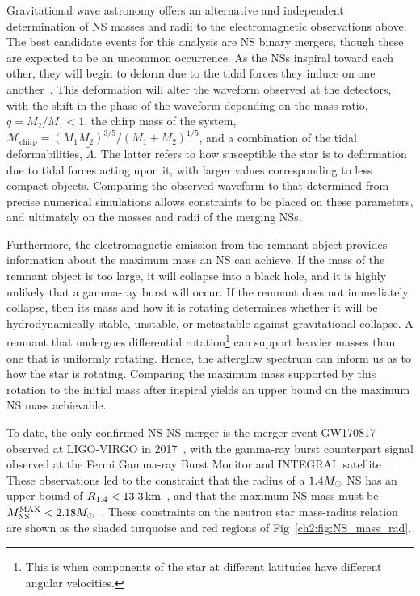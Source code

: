 Gravitational wave astronomy offers an alternative and independent determination of NS masses and radii to the electromagnetic observations above. The best candidate events for this analysis are NS binary mergers, though these are expected to be an uncommon occurrence. As the NSs inspiral toward each other, they will begin to deform due to the tidal forces they induce on one another~\cite{Lattimer:2019eez_jun_NeutronStarMass}. 
This deformation will alter the waveform observed at the detectors, with the shift in the phase of the waveform depending on the mass ratio, $q = M_2/M_1 <1$, the chirp mass of the system, $\mathcal{M}_\mathrm{chirp} = (M_1 M_2)^{3/5}/(M_1 + M_2)^{1/5}$, and a combination of the tidal deformabilities, $\tilde\Lambda$. The latter refers to how susceptible the star is to deformation due to tidal forces acting upon it, with larger values corresponding to less compact objects. Comparing the observed waveform to that determined from precise numerical simulations allows constraints to be placed on these parameters, and ultimately on the masses and radii of the merging NSs.

Furthermore, the electromagnetic emission from the remnant object provides information about the maximum mass an NS can achieve. 
If the mass of the remnant object is too large, it will collapse into a black hole, and it is highly unlikely that a gamma-ray burst will occur. If the remnant does not immediately collapse, then its mass and how it is rotating determines whether it will be hydrodynamically stable, unstable, or metastable against gravitational collapse. A remnant that undergoes differential rotation\footnote{This is when components of the star at different latitudes have different angular velocities.} can support heavier masses than one that is uniformly rotating. Hence, the afterglow spectrum can inform us as to how the star is rotating. Comparing the maximum mass supported by this rotation to the initial mass after inspiral yields an upper bound on the maximum NS mass achievable. 

To date, the only confirmed NS-NS merger is the merger event GW170817 observed at LIGO-VIRGO in 2017~\cite{LIGOScientific:2018cki_oct_GW170817MeasurementsNeutron,LIGOScientific:2018hze_Propertiesbinaryneutron}, with the gamma-ray burst counterpart signal observed at the Fermi Gamma-ray Burst Monitor and INTEGRAL satellite~\cite{LIGOScientific:2017zic_Gravitationalwavesgammarays}. These observations led to the constraint that the radius of a $1.4M_\odot$ NS has an upper bound of $R_{1.4} < 13.3{\rm \,km}$~\cite{LIGOScientific:2018cki_oct_GW170817MeasurementsNeutrona, De:2018uhw_aug_TidalDeformabilitiesRadii}, and that the maximum NS mass must be $M_\mathrm{NS}^\mathrm{MAX} < 2.18M_\odot$~\cite{LIGOScientific:2017zic_Gravitationalwavesgammarays}. These constraints on the neutron star mass-radius relation are shown as the shaded turquoise and red regions of Fig~\ref{ch2:fig:NS_mass_rad}. 

